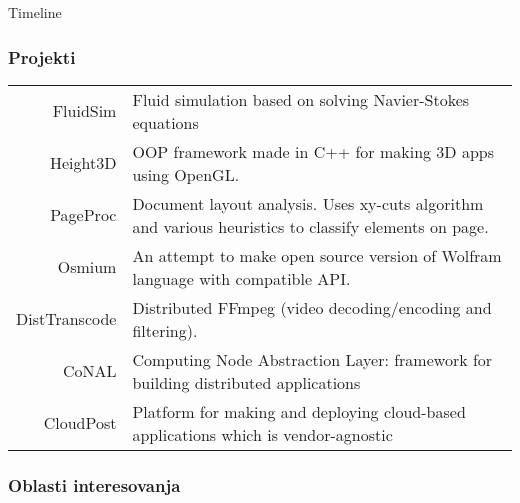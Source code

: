 \documentclass{beamer}
\newcommand{\drawperiod}[6]{%
  \pgfmathsetmacro{\startx}{1.25*#1 + 1.25*(#2-1)/12 - 1.25*2016} %
  \pgfmathsetmacro{\endx}{1.25*#3 + 1.25*(#4-1)/12 - 1.25*2016}   %
  \draw[fill=#5] (\startx,0.4) rectangle (\endx,1.2); %
  \node at ({(\startx+\endx)/2}, 0.8) {\texttt{[image: \#6]}}; %
  \draw [dashed] (\startx,0.4) -- (\startx,0);
  \draw [dashed] (\endx,0.4) -- (\endx,0);
}
\newcommand{\drawperiodabove}[6]{%
  \pgfmathsetmacro{\startx}{1.25*#1 + 1.25*(#2-1)/12 - 1.25*2016} %
  \pgfmathsetmacro{\endx}{1.25*#3 + 1.25*(#4-1)/12 - 1.25*2016}   %
  \draw[fill=#5] (\startx,2.0) rectangle (\endx,2.8); %
  \node at ({(\startx+\endx)/2}, 2.4) {\texttt{[image: \#6]}}; %
  \draw [dashed] (\startx,2.0) -- (\startx,0);
  \draw [dashed] (\endx,2.0) -- (\endx,0);
}
\newcommand{\drawperiodbelow}[6]{%
  \pgfmathsetmacro{\startx}{1.25*#1 + 1.25*(#2-1)/12 - 1.25*2016} %
  \pgfmathsetmacro{\endx}{1.25*#3 + 1.25*(#4-1)/12 - 1.25*2016}   %
  \draw[fill=#5] (\startx,-1.0) rectangle (\endx,-1.8); %
  \node at ({(\startx+\endx)/2}, -1.4) {\texttt{[image: \#6]}}; %
  \draw [dashed] (\startx,-1.2) -- (\startx,0);
  \draw [dashed] (\endx,-1.2) -- (\endx,0);
}
\begin{document}
\begin{frame}{Timeline}


\end{frame}

\begin{frame}
  \frametitle{Projekti}
  \begin{tabular}{r|p{8cm}}


    
    FluidSim & Fluid simulation based on solving Navier-Stokes equations \\
    Height3D & OOP framework made in C++ for making 3D apps using OpenGL. \\
    PageProc & Document layout analysis. Uses xy-cuts algorithm and various heuristics to classify elements on page.  \\ 
    Osmium & An attempt to make open source version of Wolfram language with compatible API. \\
    DistTranscode & Distributed FFmpeg (video decoding/encoding and filtering). \\
    CoNAL & Computing Node Abstraction Layer: framework for building distributed applications  \\
    CloudPost & Platform for making and deploying cloud-based applications which is vendor-agnostic \\
    \end{tabular}
    
  

\end{frame}

\begin{frame}
  \frametitle{Oblasti interesovanja}

  

\end{frame}
\end{document}
